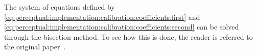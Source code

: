 The system of equations defined by \autoref{eq:perceptual:implementation:calibration:coefficients:first} and 
\autoref{eq:perceptual:implementation:calibration:coefficients:second} can be solved through the bisection method.
To see how this is done, the reader is referred to the original paper~\cite{van2005perceptual}.

